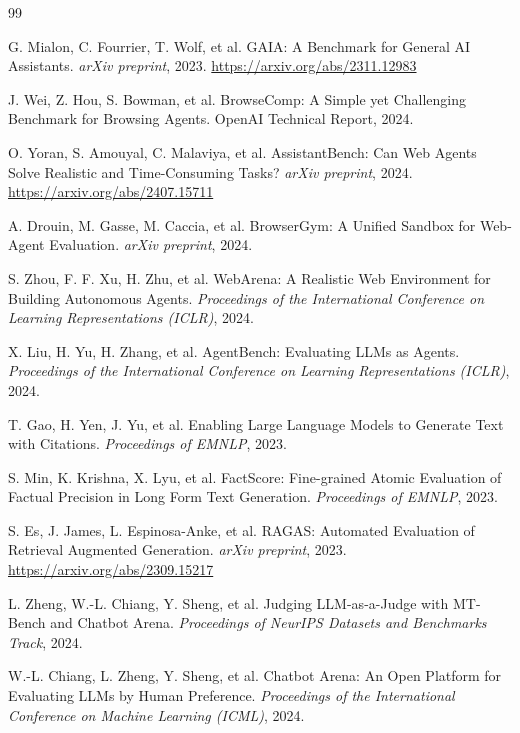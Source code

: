 \documentclass[UTF8,a4paper,12pt,oneside]{ctexart}
\begin{document}
\clearpage
\begin{thebibliography}{99}

 G. Mialon, C. Fourrier, T. Wolf, et al. GAIA: A Benchmark for General AI Assistants. \emph{arXiv preprint}, 2023. \url{https://arxiv.org/abs/2311.12983}

 J. Wei, Z. Hou, S. Bowman, et al. BrowseComp: A Simple yet Challenging Benchmark for Browsing Agents. OpenAI Technical Report, 2024.

 O. Yoran, S. Amouyal, C. Malaviya, et al. AssistantBench: Can Web Agents Solve Realistic and Time-Consuming Tasks? \emph{arXiv preprint}, 2024. \url{https://arxiv.org/abs/2407.15711}

 A. Drouin, M. Gasse, M. Caccia, et al. BrowserGym: A Unified Sandbox for Web-Agent Evaluation. \emph{arXiv preprint}, 2024.

 S. Zhou, F. F. Xu, H. Zhu, et al. WebArena: A Realistic Web Environment for Building Autonomous Agents. \emph{Proceedings of the International Conference on Learning Representations (ICLR)}, 2024.

 X. Liu, H. Yu, H. Zhang, et al. AgentBench: Evaluating LLMs as Agents. \emph{Proceedings of the International Conference on Learning Representations (ICLR)}, 2024.

 T. Gao, H. Yen, J. Yu, et al. Enabling Large Language Models to Generate Text with Citations. \emph{Proceedings of EMNLP}, 2023.

 S. Min, K. Krishna, X. Lyu, et al. FactScore: Fine-grained Atomic Evaluation of Factual Precision in Long Form Text Generation. \emph{Proceedings of EMNLP}, 2023.

 S. Es, J. James, L. Espinosa-Anke, et al. RAGAS: Automated Evaluation of Retrieval Augmented Generation. \emph{arXiv preprint}, 2023. \url{https://arxiv.org/abs/2309.15217}

 L. Zheng, W.-L. Chiang, Y. Sheng, et al. Judging LLM-as-a-Judge with MT-Bench and Chatbot Arena. \emph{Proceedings of NeurIPS Datasets and Benchmarks Track}, 2024.

 W.-L. Chiang, L. Zheng, Y. Sheng, et al. Chatbot Arena: An Open Platform for Evaluating LLMs by Human Preference. \emph{Proceedings of the International Conference on Machine Learning (ICML)}, 2024.


\end{thebibliography}
\end{document}

